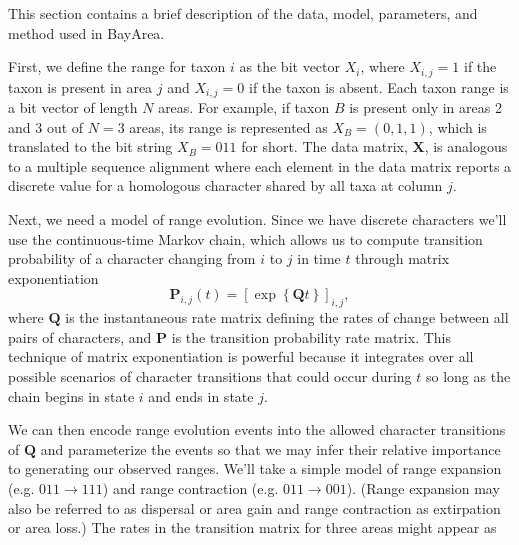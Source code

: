 \documentclass[11pt]{article}
\begin{document}
This section contains a brief description of the data, model, parameters, and method used in BayArea.

First, we define the range for taxon $i$ as the bit vector $X_i$, where $X_{i,j} = 1$ if the taxon is present in area $j$ and $X_{i,j} = 0$ if the taxon is absent.
Each taxon range is a bit vector of length $N$ areas.
For example, if taxon $B$ is present only in areas 2 and 3 out of $N=3$ areas, its range is represented as $X_B = (0,1,1)$, which is translated to the bit string $X_B=011$ for short.
The data matrix, $\textbf{X}$, is analogous to a multiple sequence alignment where each element in the data matrix reports a discrete value for a homologous character shared by all taxa at column $j$.

Next, we need a model of range evolution.
Since we have discrete characters we'll use the continuous-time Markov chain, which allows us to compute transition probability of a character changing from $i$ to $j$ in time $t$ through matrix exponentiation
\[
\mathbf{P}_{i,j}(t) = \left[ \exp \left\lbrace \mathbf{Q}t \right\rbrace \right]_{i,j},
\]
where $\textbf{Q}$ is the instantaneous rate matrix defining the rates of change between all pairs of characters, and $\textbf{P}$ is the transition probability rate matrix.
This technique of matrix exponentiation is powerful because it integrates over all possible scenarios of character transitions that could occur during $t$ so long as the chain begins in state $i$ and ends in state $j$.

We can then encode range evolution events into the allowed character transitions of $\textbf{Q}$ and parameterize the events so that we may infer their relative importance to generating our observed ranges.
We'll take a simple model of range expansion (e.g. $011 \rightarrow 111$) and range contraction (e.g. $011 \rightarrow 001$).
(Range expansion may also be referred to as dispersal or area gain and range contraction as extirpation or area loss.)
The rates in the transition matrix for three areas might appear as
\end{document}
